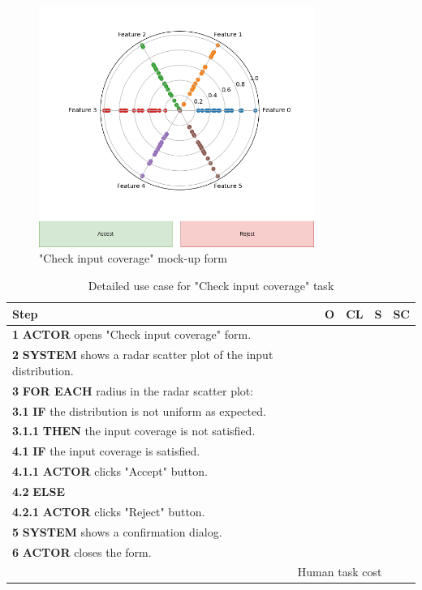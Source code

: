 \begin{figure}[H]
\centering
\includegraphics[width=0.8\textwidth]{figures/check_input_coverage.png}
\caption{"Check input coverage" mock-up form}
\end{figure}

\begin{table}[H]
\centering
\begin{tabularx}{\textwidth}{|X|c|c|c|c|}
\hline
\textbf{Step} & \textbf{O} & \textbf{CL} & \textbf{S} & \textbf{SC} \\
\hline
\textbf{1} \textbf{ACTOR} opens "Check input coverage" form. & & & & \\
\hline
\textbf{2} \textbf{SYSTEM} shows a radar scatter plot of the input distribution. & & & & \\
\hline
\textbf{3} \textbf{FOR EACH} radius in the radar scatter plot: & & & & \\
\hline
\textbf{3.1} \textbf{IF} the distribution is not uniform as expected. & & & & \\
\hline
\textbf{3.1.1} \textbf{THEN} the input coverage is not satisfied. & & & & \\
\hline
\textbf{4.1} \textbf{IF} the input coverage is satisfied. & & & & \\
\hline
\textbf{4.1.1} \textbf{ACTOR} clicks "Accept" button. & & & & \\
\hline
\textbf{4.2} \textbf{ELSE} & & & & \\
\hline
\textbf{4.2.1} \textbf{ACTOR} clicks "Reject" button. & & & & \\
\hline
\textbf{5} \textbf{SYSTEM} shows a confirmation dialog. & & & & \\
\hline
\textbf{6} \textbf{ACTOR} closes the form. & & & & \\
\hline
\multicolumn{4}{|r|}{Human task cost} & \\
\hline
\end{tabularx}
\caption{Detailed use case for "Check input coverage" task}
\label{table:check_input_coverage}
\end{table}

